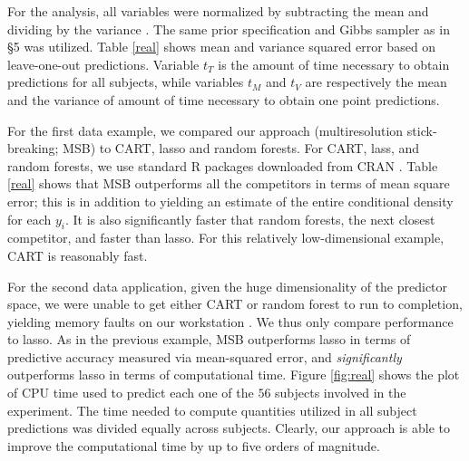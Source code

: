 For the analysis, all variables were normalized by subtracting the mean and dividing by the variance . The same prior specification and Gibbs sampler as in \S 5 was  utilized. Table \ref{real} shows mean and variance squared error based on leave-one-out predictions. Variable $t_{T}$ is the amount of time necessary to obtain predictions for all subjects, while variables $t_M$ and $t_V$ are respectively the mean and the variance  of amount of time necessary to obtain one point predictions.

For the first data example, we compared our approach (multiresolution stick-breaking; MSB) to CART, lasso and random forests. 
For CART, lass, and random forests, we use standard R packages downloaded from CRAN .
Table \ref{real} shows that MSB outperforms all the competitors in terms of mean square error; this is in addition to yielding an estimate of the entire conditional density for each $y_i$.  It is also significantly faster that random forests, the next closest competitor, and faster than lasso.  For this relatively low-dimensional example, CART is reasonably fast.  

 
 For the second data application, given the huge dimensionality of the predictor space, we were unable to get either CART or random forest to run to completion, yielding memory faults on our workstation .  We thus only compare performance to lasso.  As in the previous example, MSB outperforms lasso in terms of predictive accuracy measured via mean-squared error, and \emph{significantly} outperforms lasso in terms of computational time.  
Figure \ref{fig:real} shows the plot of CPU time used to predict each one of the $56$ subjects involved in the experiment. The time needed to compute quantities utilized in all subject predictions was divided equally across subjects. Clearly, our approach is able to improve the computational time by up to five orders of magnitude. 

